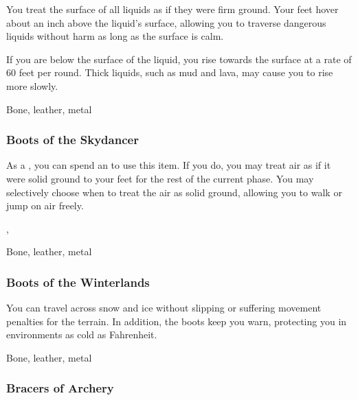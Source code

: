 You treat the surface of all liquids as if they were firm ground.
Your feet hover about an inch above the liquid's surface, allowing you to traverse dangerous liquids without harm as long as the surface is calm.

If you are below the surface of the liquid, you rise towards the surface at a rate of 60 feet per round.
Thick liquids, such as mud and lava, may cause you to rise more slowly.



 Bone, leather, metal


\lowercase{\hypertarget{item:Boots of the Skydancer}{}}\label{item:Boots of the Skydancer}
\hypertarget{item:Boots of the Skydancer}{\subsubsection{Boots of the Skydancer\hfill{}}}

As a , you can spend an  to use this item.
If you do, you may treat air as if it were solid ground to your feet for the rest of the current phase.
You may selectively choose when to treat the air as solid ground, allowing you to walk or jump on air freely.



 , 


 Bone, leather, metal


\lowercase{\hypertarget{item:Boots of the Winterlands}{}}\label{item:Boots of the Winterlands}
\hypertarget{item:Boots of the Winterlands}{\subsubsection{Boots of the Winterlands\hfill{}}}

You can travel across snow and ice without slipping or suffering movement penalties for the terrain.
In addition, the boots keep you warn, protecting you in environments as cold as  Fahrenheit.



 Bone, leather, metal


\lowercase{\hypertarget{item:Bracers of Archery}{}}\label{item:Bracers of Archery}
\hypertarget{item:Bracers of Archery}{\subsubsection{Bracers of Archery\hfill{}}}

